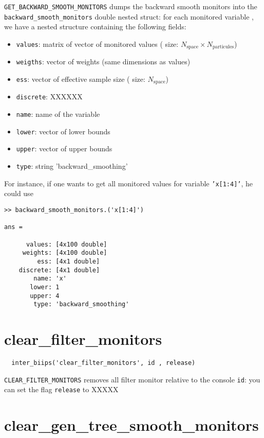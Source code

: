 \documentclass[11pt]{article}
\begin{document}
 \texttt{GET\_BACKWARD\_SMOOTH\_MONITORS} dumps the backward smooth monitors into the \texttt{backward\_smooth\_monitors} double nested struct: for each monitored variable , we have
  a nested structure containing the following fields:

  \begin{itemize}
   \item \texttt{values}: matrix of vector of monitored values ( size: $N_{\mbox{space}} \times N_{\mbox{particules}}$)
   \item \texttt{weigths}: vector of weights (same dimensions as values)
   \item \texttt{ess}: vector of effective  sample size ( size: $N_{\mbox{space}}$)
   \item \texttt{discrete}: XXXXXX
   \item \texttt{name}: name of the variable
   \item \texttt{lower}: vector of lower bounds
   \item \texttt{upper}: vector of upper bounds
   \item \texttt{type}: string 'backward\_smoothing'
   \end{itemize}

  For instance, if one wants to get all monitored values for variable \texttt{'x[1:4]'}, he could use
 \begin{lstlisting}
>> backward_smooth_monitors.('x[1:4]')

ans = 

      values: [4x100 double]
     weights: [4x100 double]
         ess: [4x1 double]
    discrete: [4x1 double]
        name: 'x'
       lower: 1
       upper: 4
        type: 'backward_smoothing'

 \end{lstlisting}

\section{clear\_filter\_monitors}
 
 \begin{lstlisting}
  inter_biips('clear_filter_monitors', id , release) 
 \end{lstlisting}
  
  \texttt{CLEAR\_FILTER\_MONITORS} removes all filter monitor relative to the console \texttt{id}: you can set the flag \texttt{release} to XXXXX

\section{clear\_gen\_tree\_smooth\_monitors}
 
\end{document}
